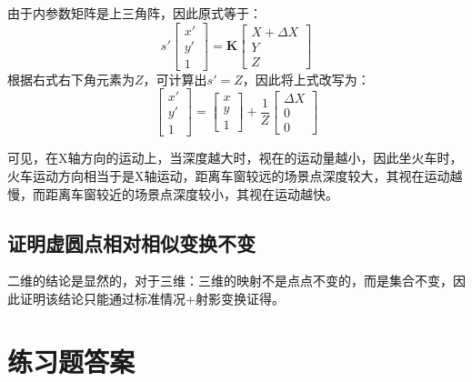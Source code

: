 \documentclass[11pt]{article}
\begin{document}
由于内参数矩阵是上三角阵，因此原式等于：
\begin{equation*}
  s'\begin{bmatrix}
    x' \\y'\\1
  \end{bmatrix}=\mathbf{K}\begin{bmatrix}
    X+\Delta X \\Y\\Z
  \end{bmatrix}
\end{equation*}
根据右式右下角元素为$Z$，可计算出$s'=Z$，因此将上式改写为：
\begin{equation*}
  \begin{bmatrix}
    x' \\y'\\1
  \end{bmatrix}=\begin{bmatrix}
    x \\y\\1
  \end{bmatrix}+\frac{1}{Z}\begin{bmatrix}
    \Delta X \\0\\0
  \end{bmatrix}
\end{equation*}\par
可见，在X轴方向的运动上，当深度越大时，视在的运动量越小，因此坐火车时，火车运动方向相当于是X轴运动，距离车窗较远的场景点深度较大，其视在运动越慢，而距离车窗较近的场景点深度较小，其视在运动越快。
\subsection{证明虚圆点相对相似变换不变}
二维的结论是显然的，对于三维：三维的映射不是点点不变的，而是集合不变，因此证明该结论只能通过标准情况+射影变换证得。
\section{练习题答案}
\end{document}
